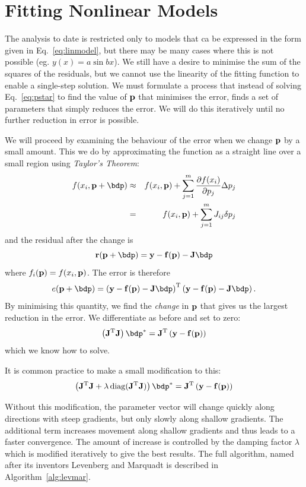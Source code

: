 \documentclass[12pt,a4paper]{tufte-handout}
\begin{document}
\section{Fitting Nonlinear Models}

The analysis to date is restricted only to models that ca be expressed in the form given in Eq.~\eqref{eq:linmodel}, but there may be many cases where this is not possible (eg. $y(x) = a\sin bx$). We still have a desire to minimise the sum of the squares of the residuals, but we cannot use the linearity of the fitting function to enable a single-step solution. We must formulate a process that instead of solving Eq.~\eqref{eq:pstar} to find the value of $\mathbf{p}$ that minimises the error, finds a set of parameters that simply reduces the error. We will do this iteratively until no further reduction in error is possible.

We will proceed by examining the behaviour of the error when we change $\mathbf{p}$ by a small amount. This we do by approximating the function as a straight line over a small region using \textit{Taylor's Theorem}:
\begin{eqnarray}
  f(x_i,\bp+\bdp) &\approx& f(x_i,\bp) + \sum_{j=1}^m \frac{\partial f(x_i)}{\partial p_j}\Delta p_j\\
  &=& f(x_i,\bp) + \sum_{j=1}^m J_{ij}\delta p_j
\end{eqnarray}
and the residual after the change is
\begin{equation}
  \br(\bp+\bdp) = \by - \bf(\bp) -\bJ\bdp
\end{equation}
where $f_i(\mathbf{p}) = f(x_i,\mathbf{p})$. The error is therefore
\begin{equation}
  e(\bp+\bdp) = \left(\by - \bf(\bp) -\bJ\bdp\right)^\rT\left(\by - \bf(\bp) -\bJ\bdp\right).
\end{equation}
 By minimising this quantity, we find the \textit{change} in $\mathbf{p}$ that gives us the largest reduction in the error. We differentiate as before and set to zero:
\begin{equation}
  \left(\bJ^\rT\bJ\right)\bdp^* = \bJ^\rT\left(\by-\bf(\bp)\right)
\end{equation}
which we know how to solve.

It is common practice to make a small modification to this:
\begin{equation}
  \left(\bJ^\rT\bJ+\lambda\diag(\bJ^\rT\bJ)\right)\bdp^* = \bJ^\rT\left(\by-\bf(\bp)\right)
\end{equation}

Without this modification, the parameter vector will change quickly along directions with steep gradients, but only slowly along shallow gradients. The additional term increases movement along shallow gradients and thus leads to a faster convergence. The amount of increase is controlled by the damping factor $\lambda$ which is modified iteratively to give the best results. The full algorithm, named after its inventors Levenberg and Marquadt is described in Algorithm~\ref{alg:levmar}.
\end{document}
